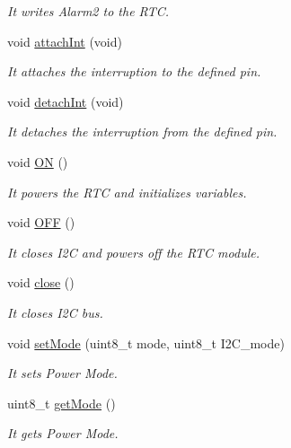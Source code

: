 \begin{DoxyCompactItemize}
\begin{DoxyCompactList}\small\item\em It writes Alarm2 to the R\+TC. \end{DoxyCompactList}\item 
void \hyperlink{class_wasp_r_t_c_a5e974e6eb577f1eac623c154f4933c59}{attach\+Int} (void)
\begin{DoxyCompactList}\small\item\em It attaches the interruption to the defined pin. \end{DoxyCompactList}\item 
void \hyperlink{class_wasp_r_t_c_ab447bc9512cfe45364f8fa5a7aad37c6}{detach\+Int} (void)
\begin{DoxyCompactList}\small\item\em It detaches the interruption from the defined pin. \end{DoxyCompactList}\item 
void \hyperlink{class_wasp_r_t_c_ab3e685d098a070d59e6955ccaae36be2}{ON} ()
\begin{DoxyCompactList}\small\item\em It powers the R\+TC and initializes variables. \end{DoxyCompactList}\item 
void \hyperlink{class_wasp_r_t_c_aba6ddf7b8a066ae1d2cdfa6609d5dcbc}{O\+FF} ()
\begin{DoxyCompactList}\small\item\em It closes I2C and powers off the R\+TC module. \end{DoxyCompactList}\item 
void \hyperlink{class_wasp_r_t_c_ae9ed6b1f9d02e69f83125aefdb561cfe}{close} ()
\begin{DoxyCompactList}\small\item\em It closes I2C bus. \end{DoxyCompactList}\item 
void \hyperlink{class_wasp_r_t_c_a680cc0ae58d1768fe95ea12548321f44}{set\+Mode} (uint8\+\_\+t mode, uint8\+\_\+t I2\+C\+\_\+mode)
\begin{DoxyCompactList}\small\item\em It sets Power Mode. \end{DoxyCompactList}\item 
uint8\+\_\+t \hyperlink{class_wasp_r_t_c_af365757369b6f1f4fe5c026bc2a2a059}{get\+Mode} ()
\begin{DoxyCompactList}\small\item\em It gets Power Mode. \end{DoxyCompactList}\item 

\end{DoxyCompactItemize}

